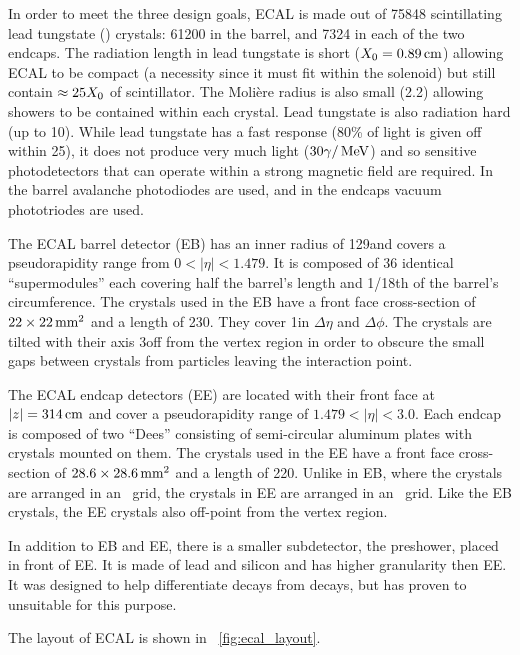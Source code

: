 In order to meet the three design goals, ECAL is made out of 75848
scintillating lead tungstate (\leadtungstate) crystals: 61200 in the barrel,
and 7324 in each of the two endcaps. The radiation length in lead tungstate is
short ($X_{0} = 0.89\text{\,cm}$) allowing ECAL to be compact (a
necessity since it must fit within the solenoid) but still contain $\approx
25X_{0}$ of scintillator. The Moli\`{e}re radius is also small
(2.2\centimeters) allowing showers to be contained within each crystal. Lead
tungstate is also radiation hard (up to 10\megarads). While lead tungstate has
a fast response (80\% of light is given off within 25\ns), it does not produce
very much light ($30 \gamma / \,\text{Me\hspace{-.08em}V}$) and so sensitive photodetectors that can
operate within a strong magnetic field are required. In the barrel avalanche
photodiodes are used, and in the endcaps vacuum phototriodes are used.

The ECAL barrel detector (EB) has an inner radius of 129\centimeters and covers
a pseudorapidity range from $0 < |\eta| < 1.479$. It is composed of 36
identical ``supermodules'' each covering half the barrel's length and 1/18th of
the barrel's circumference. The crystals used in the EB have a front face
cross-section of $22 \times 22\text{\,mm}^{2}$ and a length of
230\millimeters. They cover 1\degrees in $\Delta \eta$ and $\Delta \phi$. The
crystals are tilted with their axis 3\degrees off from the vertex region in
order to obscure the small gaps between crystals from particles leaving the
interaction point.

The ECAL endcap detectors (EE) are located with their front face at
$|z|=314\text{\,cm}$ and cover a pseudorapidity range of $1.479 < |\eta| <
3.0$. Each endcap is composed of two ``Dees'' consisting of semi-circular
aluminum plates with crystals mounted on them. The crystals used in the EE have
a front face cross-section of $28.6 \times 28.6\text{\,mm}^{2}$ and a length
of 220\millimeters. Unlike in EB, where the crystals are arranged in an
\coordetaphi~grid, the crystals in EE are arranged in an \coordxy~grid. Like
the EB crystals, the EE crystals also off-point from the vertex region.

In addition to EB and EE, there is a smaller subdetector, the preshower, placed
in front of EE. It is made of lead and silicon and has higher granularity then
EE. It was designed to help differentiate \pitogammagamma decays from
\higgstogammagamma decays, but has proven to unsuitable for this purpose.

The layout of ECAL is shown in \FIG~\ref{fig:ecal_layout}.

